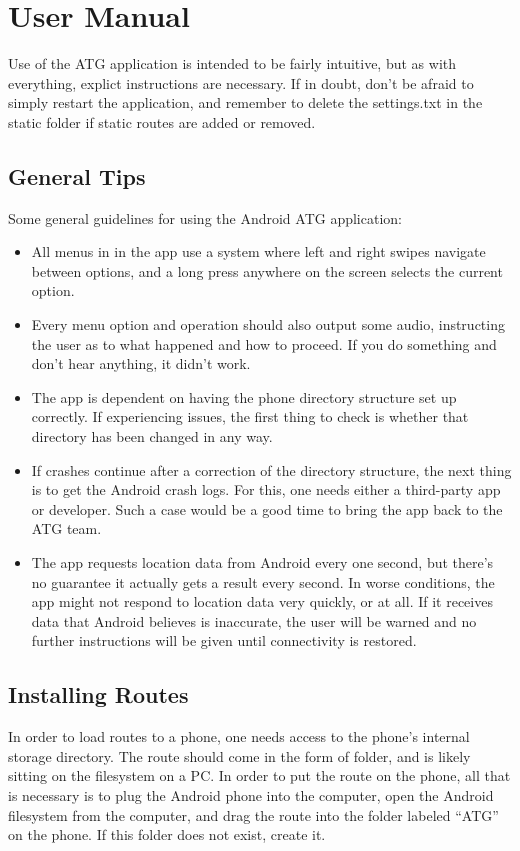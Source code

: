 \section{User Manual}
Use of the ATG application is intended to be fairly intuitive, but as with everything, explict instructions are necessary. If in doubt, don't 
be afraid to simply restart the application, and remember to delete the settings.txt in the static folder if static routes are added or
removed.
\subsection{General Tips}
Some general guidelines for using the Android ATG application:
\begin{itemize}
\item{All menus in in the app use a system where left and right swipes navigate between options, and a long press anywhere on the screen
selects the current option.}
\item{Every menu option and operation should also output some audio, instructing the user as to what happened and how to proceed. If you do
something and don't hear anything, it didn't work.}
\item{The app is dependent on having the phone directory structure set up correctly. If experiencing issues, the first thing to check is
whether that directory has been changed in any way.}
\item{If crashes continue after a correction of the directory structure, the next thing is to get the Android crash logs. For this, one
needs either a third-party app or developer. Such a case would be a good time to bring the app back to the ATG team.}
\item{The app requests location data from Android every one second, but there's no guarantee it actually gets a result every second. In worse
conditions, the app might not respond to location data very quickly, or at all. If it receives data that Android believes is inaccurate, the
user will be warned and no further instructions will be given until connectivity is restored.}
\end{itemize}
\subsection{Installing Routes}
In order to load routes to a phone, one needs access to the phone's internal storage directory. The route should come in the form of folder,
and is likely sitting on the filesystem on a PC. In order to put the route on the phone, all that is necessary is to plug the Android phone 
into the computer, open the Android filesystem from the computer, and drag the route into the folder labeled ``ATG'' on the phone. If this
folder does not exist, create it.

